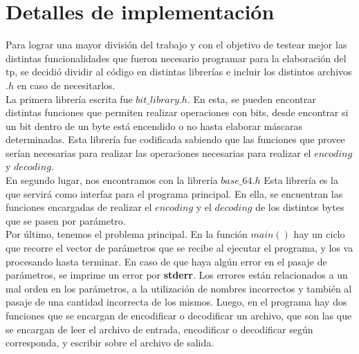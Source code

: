 \documentclass[11pt]{article}
\begin{document}
    \section*{Detalles de implementación}
        Para lograr una mayor división del trabajo y con el objetivo de testear mejor las distintas funcionalidades que fueron necesario programar para la elaboración del tp, se decidió dividir al código en distintas librerías e incluir los distintos archivos $.h$ en caso de necesitarlos.\\
        La primera librería escrita fue $bit\_library.h$. En esta, se pueden encontrar distintas funciones que permiten realizar operaciones con bits, desde encontrar si un bit dentro de un byte está encendido o no hasta elaborar máscaras determinadas. Esta librería fue codificada sabiendo que las funciones que provee serían necesarias para realizar las operaciones necesarias para realizar el $encoding$ y $decoding$. \\
        En segundo lugar, nos encontramos con la librería $base\_64.h$ Esta librería es la que servirá como interfaz para el programa principal. En ella, se encuentran las funciones encargadas de realizar el $encoding$ y el $decoding$ de los distintos bytes que se pasen por parámetro. \\
        Por último, tenemos el problema principal. En la función $main()$ hay un ciclo que recorre el vector de parámetros que se recibe al ejecutar el programa, y los va procesando hasta terminar. En caso de que haya algún error en el pasaje de parámetros, se imprime un error por \textbf{stderr}. Los errores están relacionados a un mal orden en los parámetros, a la utilización de nombres incorrectos y también al pasaje de una cantidad incorrecta de los mismos. Luego, en el programa hay dos funciones que se encargan de encodificar o decodificar un archivo, que son las que se encargan de leer el archivo de entrada, encodificar o decodificar según corresponda, y escribir sobre el archivo de salida.
\end{document}

